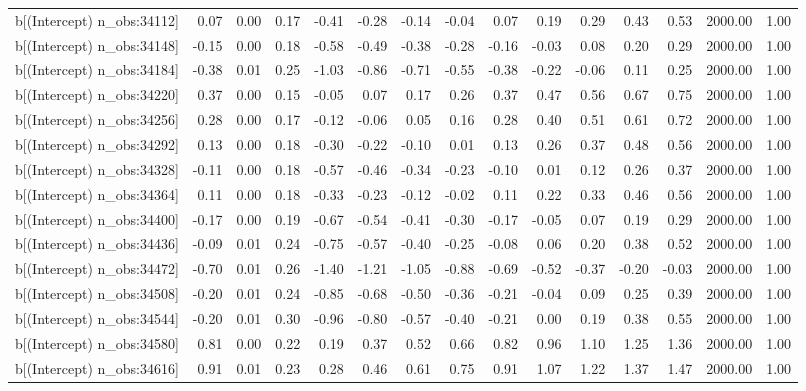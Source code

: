 \begin{table}[ht]
\begin{tabular}{rrrrrrrrrrrrrrr}
  b[(Intercept) n\_obs:34112] & 0.07 & 0.00 & 0.17 & -0.41 & -0.28 & -0.14 & -0.04 & 0.07 & 0.19 & 0.29 & 0.43 & 0.53 & 2000.00 & 1.00 \\ 
  b[(Intercept) n\_obs:34148] & -0.15 & 0.00 & 0.18 & -0.58 & -0.49 & -0.38 & -0.28 & -0.16 & -0.03 & 0.08 & 0.20 & 0.29 & 2000.00 & 1.00 \\ 
  b[(Intercept) n\_obs:34184] & -0.38 & 0.01 & 0.25 & -1.03 & -0.86 & -0.71 & -0.55 & -0.38 & -0.22 & -0.06 & 0.11 & 0.25 & 2000.00 & 1.00 \\ 
  b[(Intercept) n\_obs:34220] & 0.37 & 0.00 & 0.15 & -0.05 & 0.07 & 0.17 & 0.26 & 0.37 & 0.47 & 0.56 & 0.67 & 0.75 & 2000.00 & 1.00 \\ 
  b[(Intercept) n\_obs:34256] & 0.28 & 0.00 & 0.17 & -0.12 & -0.06 & 0.05 & 0.16 & 0.28 & 0.40 & 0.51 & 0.61 & 0.72 & 2000.00 & 1.00 \\ 
  b[(Intercept) n\_obs:34292] & 0.13 & 0.00 & 0.18 & -0.30 & -0.22 & -0.10 & 0.01 & 0.13 & 0.26 & 0.37 & 0.48 & 0.56 & 2000.00 & 1.00 \\ 
  b[(Intercept) n\_obs:34328] & -0.11 & 0.00 & 0.18 & -0.57 & -0.46 & -0.34 & -0.23 & -0.10 & 0.01 & 0.12 & 0.26 & 0.37 & 2000.00 & 1.00 \\ 
  b[(Intercept) n\_obs:34364] & 0.11 & 0.00 & 0.18 & -0.33 & -0.23 & -0.12 & -0.02 & 0.11 & 0.22 & 0.33 & 0.46 & 0.56 & 2000.00 & 1.00 \\ 
  b[(Intercept) n\_obs:34400] & -0.17 & 0.00 & 0.19 & -0.67 & -0.54 & -0.41 & -0.30 & -0.17 & -0.05 & 0.07 & 0.19 & 0.29 & 2000.00 & 1.00 \\ 
  b[(Intercept) n\_obs:34436] & -0.09 & 0.01 & 0.24 & -0.75 & -0.57 & -0.40 & -0.25 & -0.08 & 0.06 & 0.20 & 0.38 & 0.52 & 2000.00 & 1.00 \\ 
  b[(Intercept) n\_obs:34472] & -0.70 & 0.01 & 0.26 & -1.40 & -1.21 & -1.05 & -0.88 & -0.69 & -0.52 & -0.37 & -0.20 & -0.03 & 2000.00 & 1.00 \\ 
  b[(Intercept) n\_obs:34508] & -0.20 & 0.01 & 0.24 & -0.85 & -0.68 & -0.50 & -0.36 & -0.21 & -0.04 & 0.09 & 0.25 & 0.39 & 2000.00 & 1.00 \\ 
  b[(Intercept) n\_obs:34544] & -0.20 & 0.01 & 0.30 & -0.96 & -0.80 & -0.57 & -0.40 & -0.21 & 0.00 & 0.19 & 0.38 & 0.55 & 2000.00 & 1.00 \\ 
  b[(Intercept) n\_obs:34580] & 0.81 & 0.00 & 0.22 & 0.19 & 0.37 & 0.52 & 0.66 & 0.82 & 0.96 & 1.10 & 1.25 & 1.36 & 2000.00 & 1.00 \\ 
  b[(Intercept) n\_obs:34616] & 0.91 & 0.01 & 0.23 & 0.28 & 0.46 & 0.61 & 0.75 & 0.91 & 1.07 & 1.22 & 1.37 & 1.47 & 2000.00 & 1.00 \\ 

\end{tabular}
\end{table}
